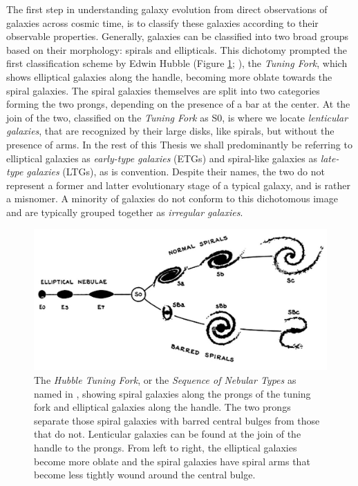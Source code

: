 The first step in understanding galaxy evolution from direct observations of galaxies across cosmic time, is to classify these galaxies according to their observable properties. Generally, galaxies can be classified into two broad groups based on their morphology: spirals and ellipticals. This dichotomy prompted the first classification scheme by Edwin Hubble (Figure \ref{fig:hubble_tuning_fork}; \citealt{Hubble_1936}), the \textit{Tuning Fork}, which shows elliptical galaxies along the handle, becoming more oblate towards the spiral galaxies. The spiral galaxies themselves are split into two categories forming the two prongs, depending on the presence of a bar at the center. At the join of the two, classified on the \textit{Tuning Fork} as S0, is where we locate \textit{lenticular galaxies}, that are recognized by their large disks, like spirals, but without the presence of arms. In the rest of this Thesis we shall predominantly be referring to elliptical galaxies as \textit{early-type galaxies} (ETGs) and spiral-like galaxies as \textit{late-type galaxies} (LTGs), as is convention. Despite their names, the two do not represent a former and latter evolutionary stage of a typical galaxy, and is rather a misnomer. A minority of galaxies do not conform to this dichotomous image and are typically grouped together as \textit{irregular galaxies}.

\begin{figure}
    \centering
	\includegraphics[width=0.9\columnwidth]{Figures/hubble_tuning_fork.pdf}
	\caption[The \textit{Hubble Tuning Fork}]{The \textit{Hubble Tuning Fork}, or the \textit{Sequence of Nebular Types} as named in \citealt{Hubble_1936}, showing spiral galaxies along the prongs of the tuning fork and elliptical galaxies along the handle. The two prongs separate those spiral galaxies with barred central bulges from those that do not. Lenticular galaxies can be found at the join of the handle to the prongs. From left to right, the elliptical galaxies become more oblate and the spiral galaxies have spiral arms that become less tightly wound around the central bulge.}
	\label{fig:hubble_tuning_fork}
\end{figure}

